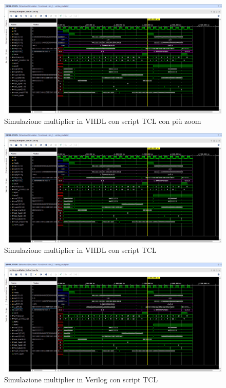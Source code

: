 \documentclass[]{IEEEtran}
\begin{document}
\begin{figure}[bt]
    \centering
    \includegraphics[width=\textwidth]{figures/sim_mult_verilog}
    \caption{Simulazione multiplier in VHDL con script TCL con più zoom}
    \label{fig:SIM_MULT_VHDL_ZOOM}
\end{figure}

\begin{figure}[bt]
    \centering
    \includegraphics[width=\textwidth]{figures/sim_mult_verilog}
    \caption{Simulazione multiplier in VHDL con script TCL}
    \label{fig:SIM_MULT_VHDL}
\end{figure}

\begin{figure}[bt]
    \centering
    \includegraphics[width=\textwidth]{figures/sim_mult_verilog}
    \caption{Simulazione multiplier in Verilog con script TCL}
    \label{fig:SIM_MULT_VERILOG}
\end{figure}
\end{document}
